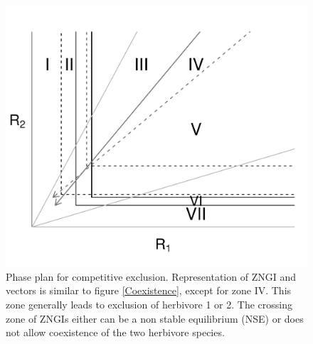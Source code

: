 \documentclass[12pt]{article}
\begin{document}
\begin{figure}[h]
\includegraphics[width=15 cm, keepaspectratio]{Exclusion}
\caption{Phase plan for competitive exclusion. Representation of ZNGI and vectors is similar to figure \ref{Coexistence}, except for zone IV. This zone generally leads to exclusion of herbivore 1 or 2. The crossing zone of ZNGIs either can be a non stable equilibrium  (NSE) or does not allow coexistence of the two herbivore species. }
\label{Exclusion}
\end{figure}
\end{document}
